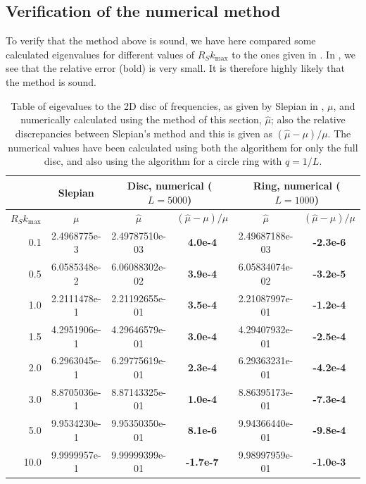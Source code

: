 \documentclass[11pt,a4paper, 
swedish,english %
]{article}
\begin{document}


\subsection{Verification of the numerical method}
To verify that the method above is sound, we have here compared some calculated eigenvalues for different values of $R_Sk_{\max}$ to the ones given in \cite{PSWF-IV_1964}. In , we see that the relative error (bold) is very small. It is therefore highly likely that the method is sound.


\begin{table}
\centering
\caption{Table of eigevalues to the 2D disc of frequencies, as given
  by Slepian in \cite{PSWF-IV_1964}, $\mu$, and numerically
  calculated using the method of this section, $\hat\mu$; also the
  relative discrepancies between Slepian's method and this is given as
  $(\hat\mu-\mu)/\mu$. The numerical values have been
  calculated using both the algorithem for only the full disc, and
  also using the algorithm for a circle ring with $q=1/L$.
}
\label{tab:verification}
\begin{tabular}{|r|c|c|c|c|c|}\cline{2-6}
\multicolumn{1}{c|}{}
&Slepian\cite{PSWF-IV_1964}&
\multicolumn{2}{|c|}{Disc, numerical ($L=5000$)}&
\multicolumn{2}{|c|}{Ring, numerical ($L=1000$)}
\\ \hline
$R_Sk_{\max}$&$\mu$
&$\hat\mu$&$(\hat\mu-\mu)/\mu$
&$\hat\mu$&$(\hat\mu-\mu)/\mu$
\\ \hline
  0.1 & 2.4968775e-3 & 
2.49787510e-03 &\bf\phantom{-}4.0e-4&  
2.49687188e-03 &\bf-2.3e-6
\\ \hline
  0.5 & 6.0585348e-2 & 
6.06088302e-02 &\bf\phantom{-}3.9e-4&  
6.05834074e-02 &\bf-3.2e-5
\\ \hline
  1.0 & 2.2111478e-1 & 
2.21192655e-01 &\bf\phantom{-}3.5e-4&  
2.21087997e-01 &\bf-1.2e-4
\\ \hline
  1.5 & 4.2951906e-1 & 
4.29646579e-01 &\bf\phantom{-}3.0e-4&  
4.29407932e-01 &\bf-2.5e-4
\\ \hline
  2.0 & 6.2963045e-1 & 
6.29775619e-01 &\bf\phantom{-}2.3e-4&  
6.29363231e-01 &\bf-4.2e-4
\\ \hline
  3.0 & 8.8705036e-1 & 
8.87143325e-01 &\bf\phantom{-}1.0e-4&  
8.86395173e-01 &\bf-7.3e-4
\\ \hline
  5.0 & 9.9534230e-1 & 
9.95350350e-01 &\bf\phantom{-}8.1e-6&  
9.94366440e-01 &\bf-9.8e-4
\\ \hline
 10.0 & 9.9999957e-1 & 
9.99999399e-01 &\bf\phantom{}-1.7e-7&  
9.98997959e-01 &\bf-1.0e-3
\\ \hline
\end{tabular}
\end{table}


\end{document}
